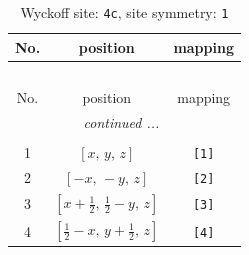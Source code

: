 \documentclass[fleqn,8pt]{jsarticle}
\begin{document}
\renewcommand{\arraystretch}{1.2}
\begin{longtable}{ccc}
\caption{Wyckoff site: {\tt 4c}, site symmetry: {\tt 1}}
 \\
 \hline \hline
No. & position & mapping \\ \hline \endfirsthead

\multicolumn{2}{l}{\tablename\ \thetable{}} \\
 \hline \hline
No. & position & mapping \\ \hline \endhead

 \hline \hline
\multicolumn{2}{r}{\footnotesize\it continued ...} \\ \endfoot

 \hline \hline
\multicolumn{2}{r}{} \\ \endlastfoot

1 & $\left[ x,\, y,\, z \right]$ & {\tt [1]} \\ \hline
2 & $\left[ - x,\, - y,\, z \right]$ & {\tt [2]} \\ \hline
3 & $\left[ x + \frac{1}{2},\, \frac{1}{2} - y,\, z \right]$ & {\tt [3]} \\ \hline
4 & $\left[ \frac{1}{2} - x,\, y + \frac{1}{2},\, z \right]$ & {\tt [4]} \\
\end{longtable}
\end{document}
